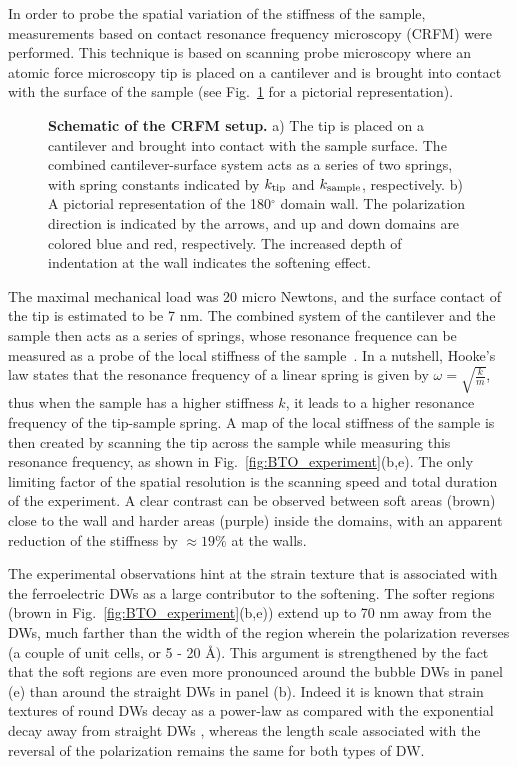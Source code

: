 In order to probe the spatial variation of the stiffness of the sample, measurements based on contact resonance frequency microscopy (CRFM) were performed.
This technique is based on scanning probe microscopy where an atomic force microscopy tip is placed on a cantilever and is brought into contact with the surface of the sample (see Fig.~\ref{fig:BTO_experimental_schematic} for a pictorial representation).
\begin{figure}
	\caption{\label{fig:BTO_experimental_schematic} {\bf Schematic of the CRFM setup.} a) The tip is placed on a cantilever and brought into contact with the sample surface. The combined cantilever-surface system acts as a series of two springs, with spring constants indicated by $k_{\rm tip}$ and $k_{\rm sample}$, respectively. b) A pictorial representation of the 180$^\circ$ domain wall. The polarization direction is indicated by the arrows, and up and down domains are colored blue and red, respectively. The increased depth of indentation at the wall indicates the softening effect.}
\end{figure}
The maximal mechanical load was 20 micro Newtons, and the surface contact of the tip is estimated to be 7 nm.
The combined system of the cantilever and the sample then acts as a series of springs, whose resonance frequence can be measured as a probe of the local stiffness of the sample~\cite{Rabe2000}.
In a nutshell, Hooke's law states that the resonance frequency of a linear spring is given by $\omega = \sqrt{\frac{k}{m}}$, thus when the sample has a higher stiffness $k$, it leads to a higher resonance frequency of the tip-sample spring.
A map of the local stiffness of the sample is then created by scanning the tip across the sample while measuring this resonance frequency, as shown in Fig.~\ref{fig:BTO_experiment}(b,e).
The only limiting factor of the spatial resolution is the scanning speed and total duration of the experiment.  
A clear contrast can be observed between soft areas (brown) close to the wall and harder areas (purple) inside the domains, with an apparent reduction of the stiffness by $\approx 19\%$ at the walls.

The experimental observations hint at the strain texture that is associated with the ferroelectric DWs as a large contributor to the softening.
The softer regions (brown in Fig.~\ref{fig:BTO_experiment}(b,e)) extend up to 70 nm away from the DWs, much farther than the width of the region wherein the polarization reverses (a couple of unit cells, or 5 - 20 \AA \cite{Zhirnov1959}).
This argument is strengthened by the fact that the soft regions are even more pronounced around the bubble DWs in panel (e) than around the straight DWs in panel (b).
Indeed it is known that strain textures of round DWs decay as a power-law as compared with the exponential decay away from straight DWs \cite{Landau1960}, whereas the length scale associated with the reversal of the polarization remains the same for both types of DW.


